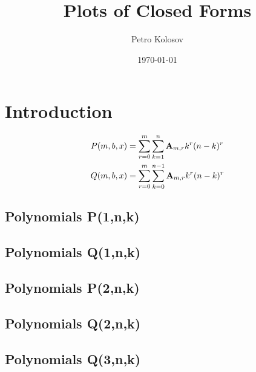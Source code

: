 \documentclass[12pt,letterpaper,oneside,reqno]{amsart}
\title[Plots of Closed Forms]
{Plots of Closed Forms}
\author[Petro Kolosov]{Petro Kolosov}
\date{\today}
\newcommand \coeffA [3][A] {{\mathbf{#1}} \sb{#2,#3}}
\newcommand \polynomialP [4][P]{{#1}(#2,#3,#4)}
\newcommand \polynomialQ [4][Q]{{#1}(#2,#3,#4)}
\begin{document}
%        

    \maketitle

    \tableofcontents


    \section{Introduction}\label{sec:introduction}
    \begin{align*}
        \polynomialP{m}{b}{x} &= \sum_{r=0}^{m} \sum_{k=1}^{n} \coeffA{m}{r} k^r (n-k)^r \\
        \polynomialQ{m}{b}{x} &= \sum_{r=0}^{m} \sum_{k=0}^{n-1} \coeffA{m}{r} k^r (n-k)^r
    \end{align*}

    \subsection{Polynomials P(1,n,k)}
    

    \subsection{Polynomials Q(1,n,k)}
    

    \subsection{Polynomials P(2,n,k)}
    

    \subsection{Polynomials Q(2,n,k)}
    

    \subsection{Polynomials Q(3,n,k)}
    


    
    
\end{document}
